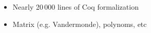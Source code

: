 \documentclass[portrait]{tikzposter}
\begin{document}
\begin{columns}
{\begin{itemize}
\item Nearly 20\,000 lines of Coq formalization

\item Matrix (e.g. Vandermonde), polynoms, etc

\end{itemize}
}%



\end{columns}
\end{document}
